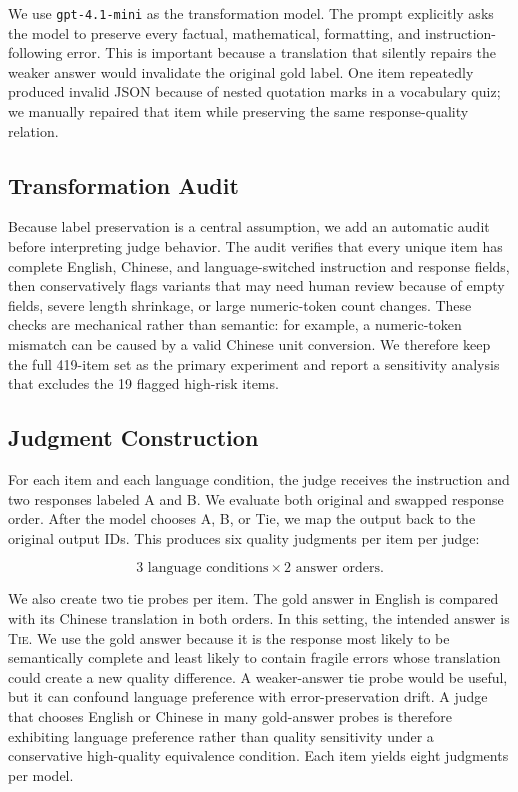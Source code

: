 \documentclass[10pt,twocolumn]{article}
\begin{document}
We use \texttt{gpt-4.1-mini} as the transformation model. The prompt explicitly asks the model to preserve every factual, mathematical, formatting, and instruction-following error. This is important because a translation that silently repairs the weaker answer would invalidate the original gold label. One item repeatedly produced invalid JSON because of nested quotation marks in a vocabulary quiz; we manually repaired that item while preserving the same response-quality relation.

\subsection{Transformation Audit}

Because label preservation is a central assumption, we add an automatic audit before interpreting judge behavior. The audit verifies that every unique item has complete English, Chinese, and language-switched instruction and response fields, then conservatively flags variants that may need human review because of empty fields, severe length shrinkage, or large numeric-token count changes. These checks are mechanical rather than semantic: for example, a numeric-token mismatch can be caused by a valid Chinese unit conversion. We therefore keep the full 419-item set as the primary experiment and report a sensitivity analysis that excludes the 19 flagged high-risk items.

\subsection{Judgment Construction}

For each item and each language condition, the judge receives the instruction and two responses labeled A and B. We evaluate both original and swapped response order. After the model chooses A, B, or Tie, we map the output back to the original output IDs. This produces six quality judgments per item per judge:

\[
3 \text{ language conditions} \times 2 \text{ answer orders}.
\]

We also create two tie probes per item. The gold answer in English is compared with its Chinese translation in both orders. In this setting, the intended answer is \textsc{Tie}. We use the gold answer because it is the response most likely to be semantically complete and least likely to contain fragile errors whose translation could create a new quality difference. A weaker-answer tie probe would be useful, but it can confound language preference with error-preservation drift. A judge that chooses English or Chinese in many gold-answer probes is therefore exhibiting language preference rather than quality sensitivity under a conservative high-quality equivalence condition. Each item yields eight judgments per model.
\end{document}
